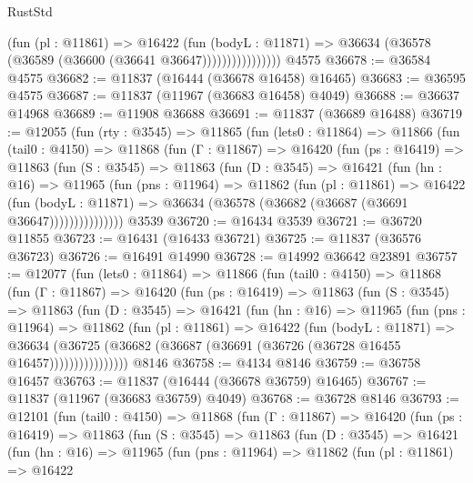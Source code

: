 \begin{lexlean}{RustStd}
\begin{coremodule}
{\begin{coremodule}
{{{{{{{{{{{{{{{{{{{{{{{{{{{{{{{{{{{{{{{{{{{{{{{{{{                        (fun (pl : @11861) =>
                        @16422
                          (fun (bodyL : @11871) =>
                          @36634 (@36578 (@36589 (@36600 (@36641 @36647))))))))))))))))
    @4575
@36678 := @36584 @4575
@36682 := @11837 (@16444 (@36678 @16458) @16465)
@36683 := @36595 @4575
@36687 := @11837 (@11967 (@36683 @16458) @4049)
@36688 := @36637 @14968
@36689 := @11908 @36688
@36691 := @11837 (@36689 @16488)
@36719 := @12055
    (fun (rty : @3545) =>
    @11865
      (fun (lets0 : @11864) =>
      @11866
        (fun (tail0 : @4150) =>
        @11868
          (fun (Γ : @11867) =>
          @16420
            (fun (ps : @16419) =>
            @11863
              (fun (S : @3545) =>
              @11863
                (fun (D : @3545) =>
                @16421
                  (fun (hn : @16) =>
                  @11965
                    (fun (pns : @11964) =>
                    @11862
                      (fun (pl : @11861) =>
                      @16422
                        (fun (bodyL : @11871) =>
                        @36634 (@36578 (@36682 (@36687 (@36691 @36647)))))))))))))))
    @3539
@36720 := @16434 @3539
@36721 := @36720 @11855
@36723 := @16431 (@16433 @36721)
@36725 := @11837 (@36576 @36723)
@36726 := @16491 @14990
@36728 := @14992 @36642 @23891
@36757 := @12077
    (fun (lets0 : @11864) =>
    @11866
      (fun (tail0 : @4150) =>
      @11868
        (fun (Γ : @11867) =>
        @16420
          (fun (ps : @16419) =>
          @11863
            (fun (S : @3545) =>
            @11863
              (fun (D : @3545) =>
              @16421
                (fun (hn : @16) =>
                @11965
                  (fun (pns : @11964) =>
                  @11862
                    (fun (pl : @11861) =>
                    @16422
                      (fun (bodyL : @11871) =>
                      @36634
                        (@36725
                          (@36682 (@36687 (@36691 (@36726 (@36728 @16455 @16457))))))))))))))))
    @8146
@36758 := @4134 @8146
@36759 := @36758 @16457
@36763 := @11837 (@16444 (@36678 @36759) @16465)
@36767 := @11837 (@11967 (@36683 @36759) @4049)
@36768 := @36728 @8146
@36793 := @12101
    (fun (tail0 : @4150) =>
    @11868
      (fun (Γ : @11867) =>
      @16420
        (fun (ps : @16419) =>
        @11863
          (fun (S : @3545) =>
          @11863
            (fun (D : @3545) =>
            @16421
              (fun (hn : @16) =>
              @11965
                (fun (pns : @11964) =>
                @11862
                  (fun (pl : @11861) =>
                  @16422
}}}}}}}}}}}}}}}}}}}}}}}}}}}}}}}}}}}}}}}}}}}}}}}}}}
\end{coremodule}}
\end{coremodule}
\end{lexlean}
